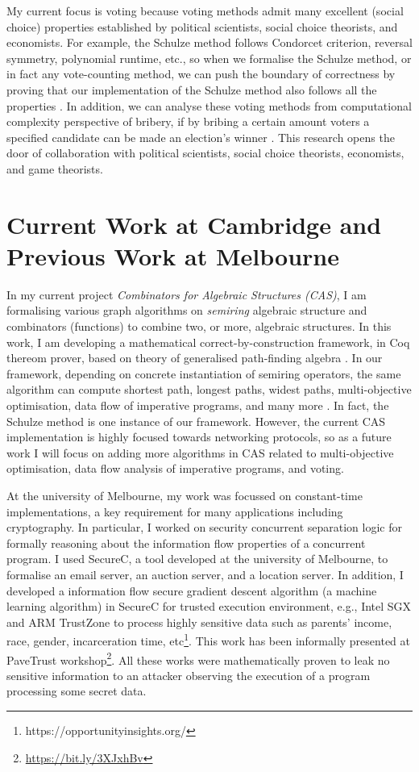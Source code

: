 \documentclass[a4paper]{article}
\begin{document}
My current focus is voting because voting methods admit many excellent (social choice) properties
established by political scientists, social choice theorists, 
and economists. For example, the Schulze method follows Condorcet criterion, reversal symmetry,
polynomial runtime, etc., so when we formalise the Schulze method, or in fact any vote-counting method, 
we can push the boundary of correctness by proving that our 
implementation of the Schulze method also follows all the properties \cite{tiwari2021machine}. 
In addition, we can analyse these voting
methods from computational complexity perspective of bribery, if by bribing a certain amount 
voters a specified candidate can be made an election's winner \cite{faliszewski2006complexity}. 
This research opens the door of collaboration with political scientists, 
social choice theorists, economists, and game theorists.



\section{Current Work at Cambridge and Previous Work at Melbourne} 
In my current project \emph{Combinators for Algebraic Structures (CAS)},
I am formalising various graph algorithms on \emph{semiring} algebraic 
structure and combinators (functions) to 
combine two, or more, algebraic structures. In this work, I am developing 
a mathematical correct-by-construction \cite{10.1007/978-3-319-66107-0_26} 
framework, in Coq thereom prover, based on theory of generalised 
path-finding algebra \cite{10.1093/imamat/15.2.161, 10.1145/1080091.1080094}. 
In our framework, depending on concrete instantiation 
of semiring operators, the same algorithm can compute shortest path, longest paths, 
widest paths, multi-objective optimisation, data flow of imperative programs, and many more \cite{gondran2008graphs}. 
In fact, the Schulze method is one instance of our framework. However, 
the current CAS implementation is highly focused towards networking protocols,
so as a future work I will focus on adding more algorithms in CAS related 
to multi-objective optimisation, data flow analysis of imperative programs, and voting. 


At the university of Melbourne, my work was focussed on constant-time implementations, 
a key requirement for many applications including cryptography. 
In particular, I worked on security concurrent separation logic for formally reasoning about 
the information flow properties of a concurrent program. 
I used SecureC, a tool developed at the university of Melbourne, to formalise an email server, 
an auction server, and a location server. 
In addition, I developed a information flow secure gradient descent algorithm (a machine learning 
algorithm) in SecureC for 
trusted execution environment, e.g., Intel SGX and ARM TrustZone to process highly sensitive 
data such as parents' income, race, gender, incarceration time, etc\footnote{https://opportunityinsights.org/}.
This work has been informally presented at PaveTrust workshop\footnote{\url{https://bit.ly/3XJxhBv}}.
All these works were mathematically proven to leak no sensitive 
information to an attacker observing the execution of a program processing 
some secret data.
\end{document}
